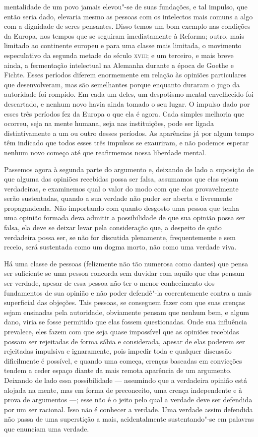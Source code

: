 mentalidade de um povo jamais elevou"-se de suas fundações, e tal impulso,
que então seria dado, elevaria mesmo as pessoas com os intelectos mais
comuns a algo com a dignidade de seres pensantes. Disso temos um bom
exemplo nas condições da Europa, nos tempos que se seguiram
imediatamente à Reforma; outro, mais limitado ao continente europeu e
para uma classe mais limitada, o movimento especulativo da segunda
metade do século \textsc{xviii}; e um terceiro, e mais breve ainda, a
fermentação intelectual na Alemanha durante a época de Goethe e Fichte.
Esses períodos diferem enormemente em relação às opiniões particulares
que desenvolveram, mas são semelhantes porque enquanto duraram
o jugo da autoridade foi rompido. Em cada um deles, um despotismo
mental envelhecido foi descartado, e nenhum novo havia ainda tomado o
seu lugar. O impulso dado por esses três períodos fez da Europa o que
ela é agora. Cada simples melhoria que ocorreu, seja na mente humana,
seja nas instituições, pode ser ligada distintivamente a um ou outro
desses períodos. As aparências já por algum tempo têm indicado que
todos esses três impulsos se exauriram, e não podemos esperar nenhum novo
começo até que reafirmemos nossa liberdade mental.

Passemos agora à segunda parte do argumento e, deixando de lado a
suposição de que alguma das opiniões recebidas possa ser falsa,
assumamos que elas sejam verdadeiras, e examinemos qual o valor do modo
com que elas provavelmente serão sustentadas, quando a sua verdade não
puder ser aberta e livremente propagandeada. Não importando com quanto
desgosto uma pessoa que tenha uma opinião formada deva admitir a
possibilidade de que sua opinião possa ser falsa, ela deve se deixar
levar pela consideração que, a despeito de quão verdadeira possa
ser, se não for discutida plenamente, frequentemente e sem receio,
será sustentada como um dogma morto, não como uma verdade viva.

Há uma classe de pessoas (felizmente não tão numerosa como dantes) que
pensa ser suficiente se uma pessoa concorda sem duvidar com aquilo que
elas pensam ser verdade, apesar de essa pessoa não ter o menor
conhecimento dos fundamentos de sua opinião e não poder defendê"-la 
coerentemente contra a mais superficial das objeções. Tais
pessoas, se conseguem fazer com que suas crenças sejam ensinadas pela
autoridade, obviamente pensam que nenhum bem, e algum dano, viria se
fosse permitido que elas fossem questionadas. Onde sua influência
prevalece, eles fazem com que seja quase impossível que as opiniões
recebidas possam ser rejeitadas de forma sábia e considerada, apesar
de elas poderem ser rejeitadas impulsiva e ignaramente, pois impedir
toda e qualquer discussão dificilmente é possível, e quando uma começa,
crenças baseadas em convicções tendem a ceder espaço diante da mais
remota aparência de um argumento. Deixando de lado essa possibilidade ---
assumindo que a verdadeira opinião está alojada na mente, mas em forma
de preconceito, uma crença independente e à prova de argumentos ---;
esse não é o jeito pelo qual a verdade deve ser defendida por um ser
racional. Isso não é conhecer a verdade. Uma verdade assim defendida
não passa de uma superstição a mais, acidentalmente sustentando"-se em
palavras que enunciam uma verdade. 

